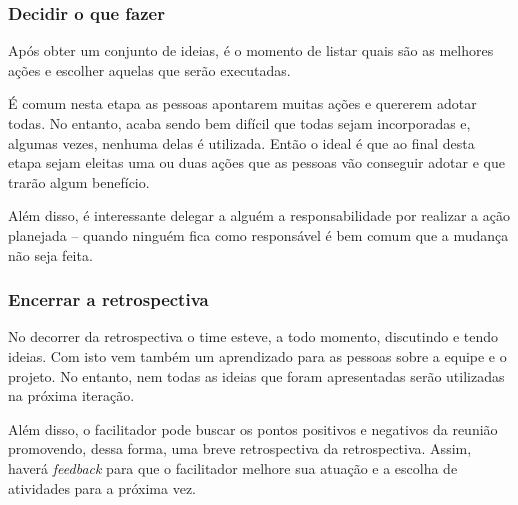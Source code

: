 \subsubsection*{Decidir o que fazer}

Após obter um conjunto de ideias, é o momento de listar quais são as melhores ações e escolher aquelas que serão executadas.

É comum nesta etapa as pessoas apontarem muitas ações e quererem adotar todas. No entanto, acaba sendo bem difícil que todas sejam incorporadas e, algumas vezes, nenhuma delas é utilizada. Então o ideal é que ao final desta etapa sejam eleitas uma ou duas ações que as pessoas vão conseguir adotar e que trarão algum benefício.

Além disso, é interessante delegar a alguém a responsabilidade por realizar a ação planejada -- quando ninguém fica como responsável é bem comum que a mudança não seja feita.

\subsubsection*{Encerrar a retrospectiva}

No decorrer da retrospectiva o time esteve, a todo momento, discutindo e tendo ideias. Com isto vem também um aprendizado para as pessoas sobre a equipe e o projeto. No entanto, nem todas as ideias que foram apresentadas serão utilizadas na próxima iteração.

Além disso, o facilitador pode  buscar os pontos positivos e negativos da reunião promovendo, dessa forma, uma breve retrospectiva da retrospectiva. Assim, haverá \textit{feedback} para que o facilitador melhore sua atuação e a escolha de atividades para a próxima vez.